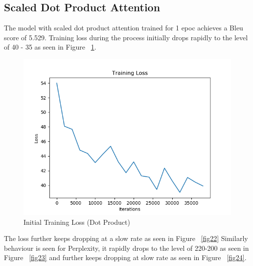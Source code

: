 \documentclass[11pt,a4paper]{article}
\begin{document}

\subsection{Scaled Dot Product Attention}
The model with scaled dot product attention trained for 1 epoc achieves a Bleu score of 5.529.
Training loss during the process initially drops rapidly to the level of 40 - 35 as seen in Figure ~\ref{fig21}.
\begin{figure}[!htbp]
\includegraphics[width=\linewidth]{de_dot_loss_1.png}
\caption{Initial Training Loss (Dot Product)}
\label{fig21}
\end{figure}

The loss further keeps dropping at a slow rate as seen in Figure ~\ref{fig22} Similarly behaviour is seen for Perplexity, it rapidly drops to the level of 220-200 as seen in Figure ~\ref{fig23} and further keeps dropping at slow rate as seen in Figure ~\ref{fig24}.


\end{document}
